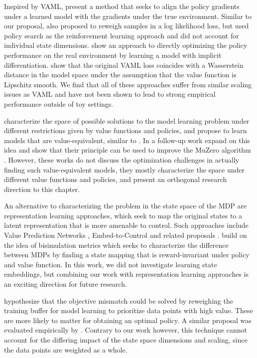 Inspired by VAML, \cite{abachi2020policy} present a method that seeks to align the policy gradients under a learned model with the gradients under the true environment. Similar to our proposal, \cite{doro2020gradient} also proposed to reweigh samples in a log likelihood loss, but used policy search as the reinforcement learning approach and did not account for individual state dimensions. \cite{nikishin2021control} show an approach to directly optimizing the policy performance on the real environment by learning a model with implicit differentiation. \cite{asadi2018equivalence} show that the original VAML loss coincides with a Wasserstein distance in the model space under the assumption that the value function is Lipschitz smooth. We find that all of these approaches suffer from similar scaling issues as VAML and have not been shown to lead to strong empirical performance outside of toy settings.

\cite{grimm2020value} characterize the space of possible solutions to the model learning problem under different restrictions given by value functions and policies, and propose to learn models that are value-equivalent, similar to \cite{vaml}. In a follow-up work \cite{grimm2021proper} expand on this idea and show that their principle can be used to improve the MuZero algorithm \parencite{schrittwieser2020mastering}. However, these works do not discuss the optimization challenges in actually finding such value-equivalent models, they mostly characterize the space under different value functions and policies, and present an orthogonal research direction to this chapter.

An alternative to characterizing the problem in the state space of the MDP are representation learning approaches, which seek to map the original states to a latent representation that is more amenable to control. Such approaches include Value Prediction Networks \parencite{oh2017value}, Embed-to-Control \parencite{10.5555/2969442.2969546} and related proposals \parencite{levine2020prediction,cui2021controlaware}. \cite{zhang2021learning} build on the idea of bisimulation metrics \parencite{ferns2004metrics,ferns2011bisimulation} which seeks to characterize the difference between MDPs by finding a state mapping that is reward-invariant under policy and value function. 
In this work, we did not investigate learning state embeddings, but combining our work with representation learning approaches is an exciting direction for future research.

\cite{lambert202objective} hypothesize that the objective mismatch could be solved by reweighing the training buffer for model learning to prioritize data points with high value. These are more likely to matter for obtaining an optimal policy. A similar proposal was evaluated empirically by \cite{nair2020goal}. Contrary to our work however, this technique cannot account for the differing impact of the state space dimensions and scaling, since the data points are weighted as a whole.


